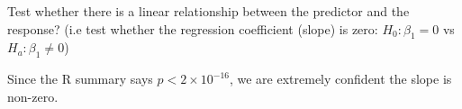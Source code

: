 Test whether there is a linear relationship between the predictor and the response?
(i.e test whether the regression coefficient (slope) is zero: $H_0 : \beta_1 = 0$ vs $H_a : \beta_1 \neq 0$)

\soln* Since the R summary says $p < 2 \times 10^{-16}$, we are extremely confident the slope is non-zero.
